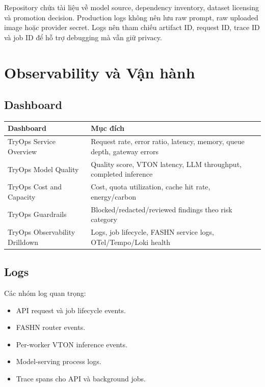\documentclass[12pt,a4paper,oneside]{report}
\begin{document}
Repository chứa tài liệu về model source, dependency inventory, dataset licensing và promotion decision. Production logs không nên lưu raw prompt, raw uploaded image hoặc provider secret. Logs nên tham chiếu artifact ID, request ID, trace ID và job ID để hỗ trợ debugging mà vẫn giữ privacy.

\chapter{Observability và Vận hành}

\section{Dashboard}

\begin{longtable}{p{5cm}p{9.8cm}}
\toprule
\textbf{Dashboard} & \textbf{Mục đích} \\
\midrule
TryOps Service Overview & Request rate, error ratio, latency, memory, queue depth, gateway errors \\
TryOps Model Quality & Quality score, VTON latency, LLM throughput, completed inference \\
TryOps Cost and Capacity & Cost, quota utilization, cache hit rate, energy/carbon \\
TryOps Guardrails & Blocked/redacted/reviewed findings theo risk category \\
TryOps Observability Drilldown & Logs, job lifecycle, FASHN service logs, OTel/Tempo/Loki health \\
\bottomrule
\end{longtable}

\section{Logs}

Các nhóm log quan trọng:

\begin{itemize}
  \item API request và job lifecycle events.
  \item FASHN router events.
  \item Per-worker VTON inference events.
  \item Model-serving process logs.
  \item Trace spans cho API và background jobs.
\end{itemize}
\end{document}
